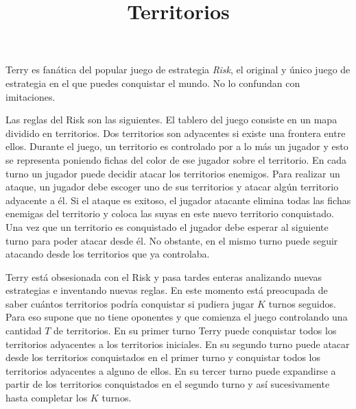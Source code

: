 \documentclass{oci}
\title{Territorios}
\begin{document}
\begin{problemDescription}
%

  Terry es fanática del popular juego de estrategia \emph{Risk}, el original 
  y único juego de estrategia en el que puedes conquistar el mundo. No lo confundan con imitaciones.

  Las reglas del Risk son las siguientes.
  El tablero del juego consiste en un mapa dividido en territorios.
  Dos territorios son adyacentes si existe una frontera entre ellos. 
  Durante el juego, un territorio es controlado por a lo más un jugador %
  y esto se representa poniendo %
  fichas del color de ese jugador sobre el territorio. 
  En cada turno un jugador puede decidir atacar los territorios enemigos.
  Para realizar un ataque, un jugador debe escoger uno de sus territorios y
  atacar algún territorio adyacente a él.
  Si el ataque es exitoso, el jugador atacante elimina todas las fichas enemigas
  del territorio y coloca las suyas en este nuevo territorio conquistado.
  Una vez que un territorio es conquistado el jugador debe esperar al siguiente
  turno para poder atacar desde él.
  No obstante, en el mismo turno puede seguir atacando desde los territorios que
  ya controlaba.

  Terry está obsesionada con el Risk y pasa tardes enteras analizando
  nuevas estrategias e inventando nuevas reglas.
  En este momento está preocupada de saber cuántos territorios podría
  conquistar si pudiera jugar $K$ turnos seguidos.
  Para eso supone que no tiene oponentes y que comienza el juego controlando una
  cantidad $T$ de territorios.
  En su primer turno Terry puede conquistar todos los territorios adyacentes a
  los territorios iniciales.
  En su segundo turno puede atacar desde los territorios conquistados en
  el primer turno y conquistar todos los territorios adyacentes a alguno de
  ellos.
  En su tercer turno puede expandirse a partir de los territorios
  conquistados en el segundo turno y así sucesivamente hasta completar los $K$
  turnos.
  

\end{problemDescription}
\end{document}
